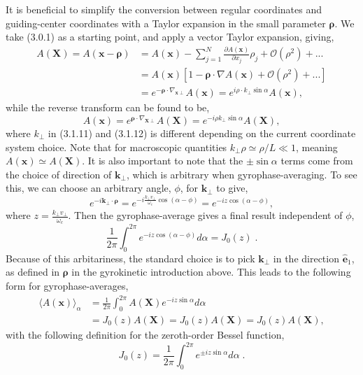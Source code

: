 \documentclass[12pt]{article}
\numberwithin{equation}{subsection}
\begin{document}
   \quad It is beneficial to simplify the conversion between regular coordinates and guiding-center coordinates with a Taylor expansion in the
small parameter $\bm{\rho}$. We take (3.0.1) as a starting point, and apply a vector Taylor expansion, giving,
   \begin{equation}
   \begin{aligned}
      A(\bm{X})  = A(\bm{x}-\bm{\rho}) 
                &= A(\bm{x}) - \sum\limits_{j=1}^{N}\frac{\partial A(\bm{x})}{\partial x_j}\rho_j + \mathcal{O}(\rho^2) + ... \\
                &= A(\bm{x})[1 - \bm{\rho}\cdot\nabla A(\bm{x}) + \mathcal{O}(\rho^2) + ...] \\
                &= e^{-\bm{\rho}\cdot\nabla_{\bm{x}\perp}}A(\bm{x})
                 = e^{i\rho\cdot k_\perp\sin\alpha}A(\bm{x}),
   \end{aligned}
   \end{equation}
while the reverse transform can be found to be,
   \begin{equation}
      A(\bm{x}) = e^{\bm{\rho}\cdot\nabla_{\bm{X}\perp}}A(\bm{X})
                = e^{-i\rho k_\perp\sin\alpha}A(\bm{X}),
   \end{equation}
where $k_\perp$ in (3.1.11) and (3.1.12) is different depending on the current coordinate system choice.
Note that for macroscopic quantities $k_\perp\rho \simeq \rho/L \ll 1$, meaning $A(\bm{x}) \simeq A(\bm{X})$.  It is also important to
note that the $\pm\sin\alpha$ terms come from the choice of direction of $\bm{k}_\perp$, which is arbitrary when gyrophase-averaging.
To see this, we can choose an arbitrary angle, $\phi$, for $\bm{k}_\perp$ to give,
   \begin{equation}
      e^{-i\bm{k}_\perp\cdot\bm{\rho}} = e^{-i\frac{k_\perp v_\perp}{\omega_c}\cos(\alpha - \phi)} = e^{-iz\cos(\alpha-\phi)},
   \end{equation}
where $z = \frac{k_\perp v_\perp}{\omega_c}$. Then the gyrophase-average gives a final result independent of $\phi$,
   \begin{equation}
      \frac{1}{2\pi}\int_{0}^{2\pi}e^{-iz\cos(\alpha-\phi)}d\alpha = J_0(z)\;.
   \end{equation}
Because of this arbitariness, the standard choice is to pick $\bm{k}_\perp$ in the direction $\bm{\hat{e}}_1$, as defined in
$\bm{\rho}$ in the gyrokinetic introduction above. This leads to the following form for gyrophase-averages,
   \begin{equation}
   \begin{aligned}
      \langle A(\bm{x})\rangle_\alpha &= \frac{1}{2\pi}\int_{0}^{2\pi}A(\bm{X})e^{-iz\sin\alpha} d\alpha \\
                                      &= J_0(z) A(\bm{X}) = J_0(z)A(\bm{X}) = J_0(z)A(\bm{X}),
   \end{aligned}
   \end{equation}
with the following definition for the zeroth-order Bessel function,
   \begin{equation}
      J_0(z) = \frac{1}{2\pi}\int_{0}^{2\pi}e^{\pm iz\sin\alpha}d\alpha\;.
   \end{equation}
\end{document}
